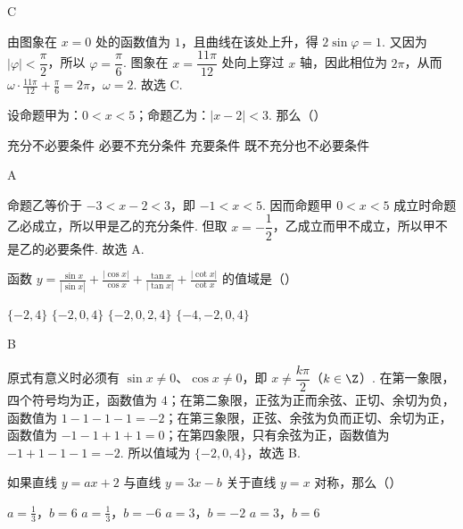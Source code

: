 \begin{answer}C\end{answer}

\begin{solution}
由图象在 \(x=0\) 处的函数值为 \(1\)，且曲线在该处上升，得 \(2\sin\varphi=1\). 又因为 \(\left|\varphi\right|<\dfrac\pi2\)，所以 \(\varphi=\dfrac\pi6\). 图象在 \(x=\dfrac{11\pi}{12}\) 处向上穿过 \(x\) 轴，因此相位为 \(2\pi\)，从而
\(\omega\cdot\frac{11\pi}{12}+\frac\pi6=2\pi\)，\(\omega=2\).
故选 C.
\end{solution}


\begin{problem}
设命题甲为：\(0<x<5\)；命题乙为：\(\left| x-2 \right|<3\). 那么（\quad）

\choices
    {充分不必要条件}
    {必要不充分条件}
    {充要条件}
    {既不充分也不必要条件}
\end{problem}

\begin{answer}A\end{answer}

\begin{solution}
命题乙等价于 \(-3<x-2<3\)，即 \(-1<x<5\). 因而命题甲 \(0<x<5\) 成立时命题乙必成立，所以甲是乙的充分条件. 但取 \(x=-\dfrac12\)，乙成立而甲不成立，所以甲不是乙的必要条件. 故选 A.
\end{solution}


\begin{problem}
函数 \(y=\frac{\sin x}{\left| \sin x \right|}+\frac{\left| \cos x \right|}{\cos x}+\frac{\tan x}{\left| \tan x \right|}+\frac{\left| \cot x \right|}{\cot x}\) 的值域是（\quad）

\choices
    {\(\{-2,4\}\)}
    {\(\{-2,0,4\}\)}
    {\(\{-2,0,2,4\}\)}
    {\(\{-4,-2,0,4\}\)}
\end{problem}

\begin{answer}B\end{answer}

\begin{solution}
原式有意义时必须有 \(\sin x\ne0\)、\(\cos x\ne0\)，即 \(x\ne\dfrac{k\pi}{2}\)（\(k\in\Z\)）. 在第一象限，四个符号均为正，函数值为 \(4\)；在第二象限，正弦为正而余弦、正切、余切为负，函数值为 \(1-1-1-1=-2\)；在第三象限，正弦、余弦为负而正切、余切为正，函数值为 \(-1-1+1+1=0\)；在第四象限，只有余弦为正，函数值为 \(-1+1-1-1=-2\). 所以值域为 \(\{-2,0,4\}\)，故选 B.
\end{solution}


\begin{problem}
如果直线 \(y=ax+2\) 与直线 \(y=3x-b\) 关于直线 \(y=x\) 对称，那么（\quad）

\choices
    {\(a=\frac{1}{3}\)，\(b=6\)}
    {\(a=\frac{1}{3}\)，\(b=-6\)}
    {\(a=3\)，\(b=-2\)}
    {\(a=3\)，\(b=6\)}
\end{problem}


